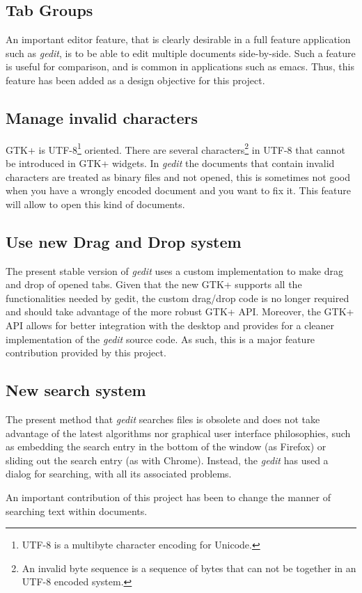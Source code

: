 \subsection{Tab Groups}\label{sec:TabGroups}

An important editor feature, that is clearly desirable in a full feature application 
such as \emph{gedit}, is to be able to edit multiple documents side-by-side. 
Such a feature is useful for comparison, and is common in applications such as emacs. 
Thus, this feature has been added as a design objective for this project.


\subsection{Manage invalid characters}\label{sec:InvalidChars}

GTK+ is UTF-8\footnote{UTF-8 is a multibyte character encoding for Unicode.} oriented. There 
are several characters\footnote{An invalid byte sequence is a sequence of bytes that can not be 
together in an UTF-8 encoded system.} in UTF-8 that cannot be introduced in GTK+ widgets. 
In \emph{gedit} the documents that contain invalid characters are treated as binary files and not 
opened, this is sometimes not good when you have a wrongly encoded document and you want to fix it. 
This feature will allow to open this kind of documents.


\subsection{Use new Drag and Drop system}\label{sec:DND}

The present stable version of \emph{gedit} uses a custom implementation to make 
drag and drop of opened tabs.  Given that the new GTK+ supports all the functionalities 
needed by gedit, the custom drag/drop code is no longer required and should take advantage
of the more robust GTK+ API.  Moreover, the GTK+ API allows for better integration 
with the desktop and provides for a cleaner implementation of the \emph{gedit} source code.
As such, this is a major feature contribution provided by this project.


\subsection{New search system}\label{sec:SearchSystem}

The present method that \emph{gedit} searches files is obsolete and does not take advantage of 
the latest algorithms nor graphical user interface philosophies, such as embedding the search 
entry in the bottom of the window (as Firefox) or sliding out the search entry (as with Chrome). 
Instead, the \emph{gedit} has used a dialog for searching, with all its associated problems. 

An important contribution of this project has been to change the manner of searching text 
within documents.
